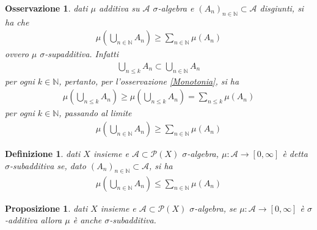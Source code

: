 \documentclass[oneside, 11pt]{amsbook}
\newcommand{\0}{{(0)}}
\newcommand{\3}{{(3)}}
\theoremstyle{colonplain}
\newtheorem{prop}[thm]{Proposizione}
\theoremstyle{colondefinition}
\newtheorem{defn}[thm]{Definizione}
\theoremstyle{colonremark}
\newtheorem{rmk}[thm]{Osservazione}
\numberwithin{equation}{chapter}
\begin{document}
\begin{rmk} dati $\mu$ additiva su $\mathcal{A}$ $\sigma$-algebra e $(A_n)_{n \in \mathbb{N}} \subset \mathcal{A}$ disgiunti, si ha che
\begin{align}
    \mu\left(\bigcup_{n \in \mathbb{N}} A_n\right) \geq \sum_{n \in \mathbb{N}} \mu(A_n)
\end{align}
ovvero $\mu$ $\sigma$-\textit{supadditiva}. Infatti
\begin{align}
    \bigcup_{n \leq k} A_n \subset \bigcup_{n \in \mathbb{N}} A_n
\end{align}
per ogni $k \in \mathbb{N}$, pertanto, per l'osservazione \ref{Monotonia}, si ha
\begin{align}
    \mu\left(\bigcup_{n \leq k} A_n\right) \geq \mu\left(\bigcup_{n \leq k} A_n\right) = \sum_{n \leq k} \mu(A_n)
\end{align}
per ogni $k \in \mathbb{N}$, passando al limite
\begin{align}
    \mu\left(\bigcup_{n \in \mathbb{N}} A_n\right) \geq \sum_{n \in \mathbb{N}} \mu(A_n)
\end{align}
\end{rmk}
\begin{defn}
dati $X$ insieme e $\mathcal{A} \subset \mathcal{P}(X)$ $\sigma$-algebra, $\mu : \mathcal{A} \longrightarrow [0, \infty]$ è detta $\sigma$-\textit{subadditiva} se, dato $(A_n)_{n \in \mathbb{N}} \subset \mathcal{A}$, si ha
\begin{align}
    \mu\left(\bigcup_{n \in \mathbb{N}} A_n\right) \leq \sum_{n \in \mathbb{N}} \mu(A_n)
\end{align}
\end{defn}
\begin{prop}\label{Add->SubAdd}
dati $X$ insieme e $\mathcal{A} \subset \mathcal{P}(X)$ $\sigma$-algebra, se $\mu : \mathcal{A} \longrightarrow [0, \infty]$ è $\sigma$-additiva allora $\mu$ è anche $\sigma$-subadditiva.
\end{prop}
\end{document}
